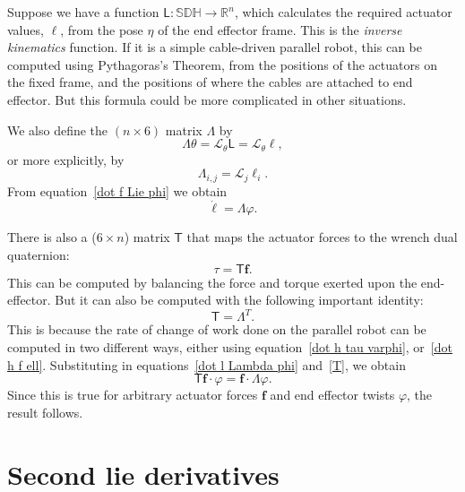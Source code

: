 \documentclass[reqno,12pt]{amsart}
\newcommand\setunitdualquat{\mathbb S\mathbb D\mathbb H}
\newcommand{\liederiv}{\mathcal L}
\begin{document}
Suppose we have a function $\mathsf L : \setunitdualquat \to \mathbb R^n$, which calculates the required actuator values, $\bm \ell$, from the pose $\eta$ of the end effector frame.  This is the \emph{inverse kinematics} function.  If it is a simple cable-driven parallel robot, this can be computed using Pythagoras's Theorem, from the positions of the actuators on the fixed frame, and the positions of where the cables are attached to end effector.  But this formula could be more complicated in other situations.

We also define the $(n \times 6)$ matrix $\mathsf \Lambda$ by
\begin{equation}
\label{Lambda}
\mathsf \Lambda \theta = \liederiv_\theta \mathsf L = \liederiv_\theta \bm \ell ,
\end{equation}
or more explicitly, by
\begin{equation}
\mathsf \Lambda_{i,j} = \liederiv_j \mathsf \ell_i .
\end{equation}
From equation~\eqref{dot f Lie phi} we obtain
\begin{equation}
\label{dot l Lambda phi}
\dot{\bm \ell} = \mathsf \Lambda \varphi .
\end{equation}

There is also a ($6 \times n$) matrix $\mathsf T$ that maps the actuator forces to the wrench dual quaternion:
\begin{equation}
\label{T}
\tau = \mathsf T \bm f .
\end{equation}
This can be computed by balancing the force and torque exerted upon the end-effector.  But it can also be computed with the following important identity:
\begin{equation}
\label{T=L^T}
\mathsf T = \mathsf \Lambda^T.
\end{equation}
This is because the rate of change of work done on the parallel robot can be computed in two different ways, either using equation~\eqref{dot h tau varphi}, or~\eqref{dot h f ell}.  Substituting in equations~\eqref{dot l Lambda phi} and~\eqref{T}, we obtain
\begin{equation}
\mathsf T \bm f \cdot \varphi = \bm f \cdot \mathsf \Lambda \varphi.
\end{equation}
Since this is true for arbitrary actuator forces $\bm f$ and end effector twists $\varphi$, the result follows.

\section{Second lie derivatives}
\end{document}
